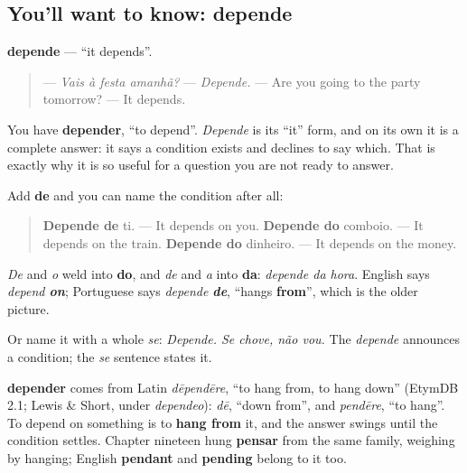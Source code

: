 \subsection*{You'll want to know: depende}
\textbf{depende} — \textquotedblleft{}it depends\textquotedblright{}.

\begin{quote}
— \emph{Vais à festa amanhã?} — \emph{Depende.} — Are you going to the party tomorrow? — It depends.
\end{quote}

You have \textbf{depender}, \textquotedblleft{}to depend\textquotedblright{}. \emph{Depende} is its \textquotedblleft{}it\textquotedblright{} form, and on its own it is a complete answer: it says a condition exists and declines to say which. That is exactly why it is so useful for a question you are not ready to answer.

\begin{grammarlens}[title={Grammar Lens: depende de}]
Add \textbf{de} and you can name the condition after all:

\begin{quote}
\textbf{Depende de} ti. — It depends on you. \textbf{Depende do} comboio. — It depends on the train. \textbf{Depende do} dinheiro. — It depends on the money.
\end{quote}

\emph{De} and \emph{o} weld into \textbf{do}, and \emph{de} and \emph{a} into \textbf{da}: \emph{depende da hora}. English says \emph{depend \textbf{on}}; Portuguese says \emph{depende \textbf{de}}, \textquotedblleft{}hangs \textbf{from}\textquotedblright{}, which is the older picture.

Or name it with a whole \emph{se}: \emph{Depende. Se chove, não vou.} The \emph{depende} announces a condition; the \emph{se} sentence states it.
\end{grammarlens}

\begin{cousinweb}
\textbf{depender} comes from Latin \emph{dēpendēre}, \textquotedblleft{}to hang from, to hang down\textquotedblright{} (EtymDB 2.1; Lewis \& Short, under \emph{dependeo}): \emph{dē}, \textquotedblleft{}down from\textquotedblright{}, and \emph{pendēre}, \textquotedblleft{}to hang\textquotedblright{}. To depend on something is to \textbf{hang from} it, and the answer swings until the condition settles. Chapter nineteen hung \textbf{pensar} from the same family, weighing by hanging; English \textbf{pendant} and \textbf{pending} belong to it too.
\end{cousinweb}

